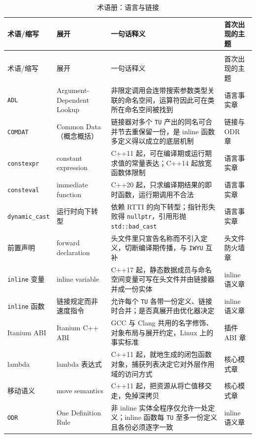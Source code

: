 \documentclass[12pt,a4paper,fontset=fandol]{ctexbook}
\newcommand{\cpp}[1]{C++#1}
\newcommand{\Tp}[1]{\texttt{#1}}
\newcommand{\Bk}{\discretionary{}{}{}}
\begin{document}
\begin{longtable}{@{}>{\raggedright\arraybackslash}p{}
                  >{\raggedright\arraybackslash}p{}
                  >{\raggedright\arraybackslash}p{}
                  >{\raggedright\arraybackslash}p{}@{}}
\caption{术语册：语言与链接}\label{tab:apA-lang}\\
\toprule
术语/缩写 & 展开 & 一句话释义 & 首次出现的主题 \\
\midrule
\endfirsthead
\multicolumn{4}{@{}l}{表~\thetable\ （续）}\\
\toprule
术语/缩写 & 展开 & 一句话释义 & 首次出现的主题 \\
\midrule
\endhead
\bottomrule
\endlastfoot
\Tp{ADL} & Argument-Dependent Lookup & 非限定调用会连带搜索参数类型关联的命名空间，运算符因此可在类所在命名空间被找到 & 语言事实章 \\
\Tp{COMDAT} & Common Data（概念概括） & 链接器对多个 \Tp{TU} 产出的同名可合并节去重保留一份，是 inline 函数多定义得以成立的底层机制 & 链接与 ODR 章 \\
\Tp{constexpr} & constant expression & \cpp{11} 起，可在编译期或运行期求值的常量表达；\cpp{14} 起放宽函数体限制 & 语言事实章 \\
\Tp{consteval} & immediate function & \cpp{20} 起，只求编译期结果的即时函数，运行期调用不合法 & 语言事实章 \\
\Tp{dynamic{\Bk}\_cast} & 运行时向下转型 & 依赖 RTTI 的向下转型；指针形失败得 \Tp{nullptr}，引用形抛 \Tp{std::bad{\Bk}\_cast} & 语言事实章 \\
前置声明 & forward declaration & 头文件里只宣告名称而不引入定义，切断编译期传播，与 \Tp{IWYU} 互补 & 头文件防火墙章 \\
\Tp{inline} 变量 & inline variable & \cpp{17} 起，静态数据成员与命名空间变量可写在头文件并由链接器并成一份实体 & inline 语义章 \\
\Tp{inline} 函数 & 链接规定而非速度指令 & 允许每个 \Tp{TU} 各带一份定义、链接时合并；是否真展开由优化器决定 & inline 语义章 \\
Itanium ABI & Itanium C++ ABI & GCC 与 Clang 共用的名字修饰、对象布局与展开约定，Linux 上的事实标准 & 插件 ABI 章 \\
lambda & lambda 表达式 & \cpp{11} 起，就地生成的闭包函数对象，捕获列表决定它对外层作用域的访问方式 & 核心模式章 \\
移动语义 & move semantics & \cpp{11} 起，把资源从将亡值移交走，免掉深拷贝 & 核心模式章 \\
\Tp{ODR} & One Definition Rule & 非 inline 实体全程序仅允许一处定义；inline 函数每 \Tp{TU} 至多一份定义且各份必须逐字一致 & inline 语义章 \\

\end{longtable}
\end{document}
